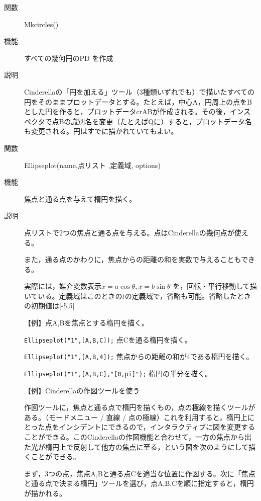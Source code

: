 \documentclass[papersize,a4paper,12pt,uplatex]{jsarticle}
\begin{document}
\begin{description}

\vspace{\baselineskip}
\hypertarget{mkcircles}{}
\item[関数]  Mkcircles()
\item[機能]  すべての幾何円のPD を作成
\item[説明]  Cinderellaの「円を加える」ツール（3種類いずれでも）で描いたすべての円をそのままプロットデータとする。たとえば，中心A，円周上の点をBとした円を作ると，プロットデータcrABが作成される。その後，インスペクタで点Bの識別名を変更（たとえばQに）すると，プロットデータ名も変更される。円はすでに描かれていてもよい。

\vspace{\baselineskip}
\hypertarget{ellipseplot}{}
\item[関数]  Ellipseplot(name,点リスト ,定義域, options)
\item[機能]  焦点と通る点を与えて楕円を描く。
\item[説明]  点リストで2つの焦点と通る点を与える。点はCinderellaの幾何点が使える。

  また，通る点のかわりに，焦点からの距離の和を実数で与えることもできる。
  
  実際には，媒介変数表示$x=a \cos \theta,x=b \sin \theta$ を，回転・平行移動して描いている。定義域はこのときの$t$の定義域で，省略も可能。省略したときの初期値は[-5,5]

\vspace{\baselineskip}
【例】点A,Bを焦点とする楕円を描く。

\verb|Ellipseplot("1",[A,B,C]);|   点Cを通る楕円を描く。

\verb|Ellipseplot("1",[A,B,4]);|   焦点からの距離の和が4である楕円を描く。

\verb|Ellipseplot("1",[A,B,C],"[0,pi]");|   楕円の半分を描く。

\vspace{\baselineskip}
【例】Cinderellaの作図ツールを使う

作図ツールに，焦点と通る点で楕円を描くもの，点の極線を描くツールがある。（モードメニュー / 直線 / 点の極線）これを利用すると，楕円上にとった点をインシデントにできるので，インタラクティブに図を変更することができる。このCinderellaの作図機能と合わせて，一方の焦点から出た光が楕円上で反射して他方の焦点に至る，という図を次のようにして描くことができる。

まず，3つの点，焦点A,Bと通る点Cを適当な位置に作図する。次に「焦点と通る点で決まる楕円」ツールを選び，点A,B,Cを順に指定すると，楕円が描かれる。


\end{description}
\end{document}
